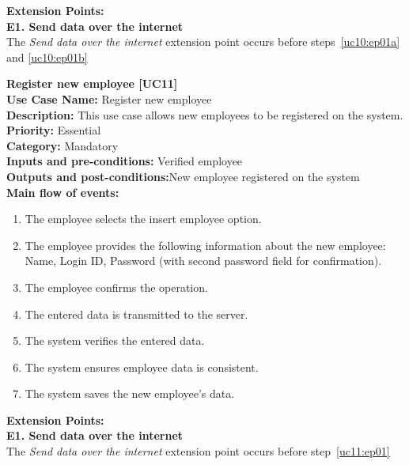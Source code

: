 \documentclass[11pt,twoside]{article}
\begin{document}
\textbf{Extension Points:}\\
\textbf{E1. Send data over the internet}\\
The \textit{Send data over the internet} extension point occurs before steps~\ref{uc10:ep01a} and \ref{uc10:ep01b}

\textbf{Register new employee [UC11]}\\
\textbf{Use Case Name:} Register new employee \\
\textbf{Description:} This use case allows new employees to be registered on the system.\\
\textbf{Priority:} Essential \\
\textbf{Category:} Mandatory \\
\textbf{Inputs and pre-conditions:} Verified employee\\
\textbf{Outputs and post-conditions:}New employee registered on the system\\
\textbf{Main flow of events:}\\
\begin{enumerate}
\item The employee selects the insert employee option.
\item The employee provides the following information about the new
employee: Name, Login ID, Password (with second password field for confirmation).
\item The employee confirms the operation.
\item \label{uc11:ep01} The entered data is transmitted to the server.
\item The system verifies the entered data.
\item The system ensures employee data is consistent.
\item The system saves the new employee's data.
\end{enumerate}

\textbf{Extension Points:}\\
\textbf{E1. Send data over the internet}\\
The \textit{Send data over the internet} extension point occurs before step~\ref{uc11:ep01}
\end{document}
